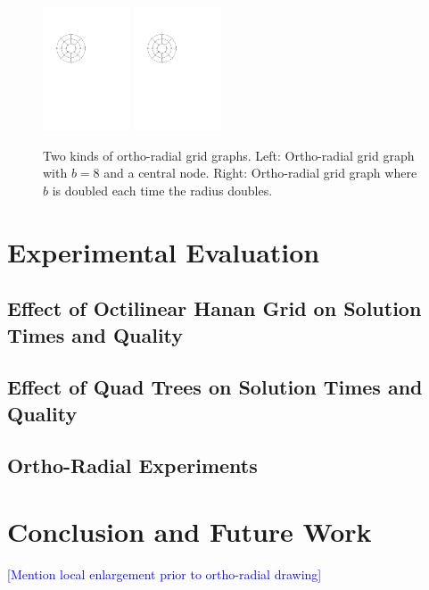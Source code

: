 \documentclass[sigconf]{acmart}
\newcommand\TODO[1]{\textcolor{blue}{\small [#1]}}
\begin{document}
\begin{figure}
    \centering
	\includegraphics[width=0.23\textwidth]{figures2/ortho.pdf}
	\hfill
	\includegraphics[width=0.23\textwidth,page=2]{figures2/ortho.pdf}
	\caption{Two kinds of ortho-radial grid graphs. Left: Ortho-radial grid graph with $b = 8$ and a central node. Right: Ortho-radial grid graph where $b$ is doubled each time the radius doubles.}
	\label{FIG:orthoradgrid}
\end{figure}

\section{Experimental Evaluation}

\subsection{Effect of Octilinear Hanan Grid on Solution Times and Quality}

\subsection{Effect of Quad Trees on Solution Times and Quality}

\subsection{Ortho-Radial Experiments}

\section{Conclusion and Future Work}

\TODO{Mention local enlargement prior to ortho-radial drawing}



\end{document}
